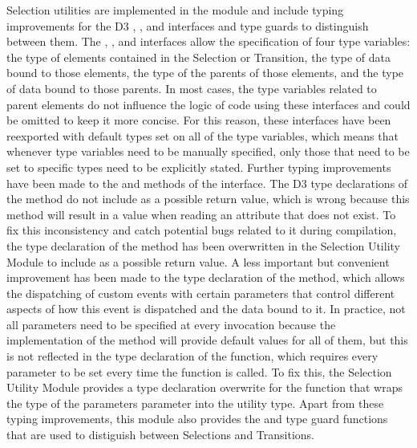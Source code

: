 Selection utilities are implemented in the  module and include typing improvements for the D3 , , and  interfaces and type guards to distinguish between them.
The , , and  interfaces allow the specification of four type variables: the type of elements contained in the Selection or Transition, the type of data bound to those elements, the type of the parents of those elements, and the type of data bound to those parents.
In most cases, the type variables related to parent elements do not influence the logic of code using these interfaces and could be omitted to keep it more concise.
For this reason, these interfaces have been reexported with default types set on all of the type variables, which means that whenever type variables need to be manually specified, only those that need to be set to specific types need to be explicitly stated.
Further typing improvements have been made to the  and  methods of the  interface.
The D3 type declarations of the  method do not include  as a possible return value, which is wrong because this method will result in a  value when reading an attribute that does not exist.
To fix this inconsistency and catch potential bugs related to it during compilation, the type declaration of the  method has been overwritten in the Selection Utility Module to include  as a possible return value.
A less important but convenient improvement has been made to the type declaration of the  method, which allows the dispatching of custom events with certain parameters that control different aspects of how this event is dispatched and the data bound to it.
In practice, not all parameters need to be specified at every invocation because the implementation of the  method will provide default values for all of them, but this is not reflected in the type declaration of the function, which requires every parameter to be set every time the function is called.
To fix this, the Selection Utility Module provides a type declaration overwrite for the  function that wraps the type of the parameters parameter into the  utility type.
Apart from these typing improvements, this module also provides the  and  type guard functions that are used to distiguish between Selections and Transitions.


